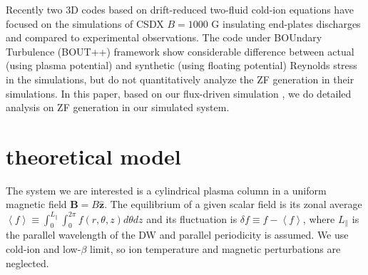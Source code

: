 \documentclass[aps,pre,twocolumn,superscriptaddress]{revtex4-2}
\begin{document}
Recently two 3D codes based on drift-reduced two-fluid cold-ion equations have focused on the simulations of CSDX $B=1000$ G insulating end-plates discharges \cite{Vaezi_2017V, Lang_2019} and compared to experimental observations. The code under BOUndary Turbulence (BOUT++) framework \cite{Vaezi_2017V} show considerable difference between actual (using plasma potential) and synthetic (using floating potential) Reynolds stress in the simulations, but do not quantitatively analyze the ZF generation in their simulations. In this paper, based on our flux-driven simulation \cite{Lang_2019}, we do detailed analysis on ZF generation in our simulated system.  

\section{\label{sec:theoretical model}theoretical model}
The system we are interested is a cylindrical plasma column in a uniform magnetic field $\bm{B}=B\hat{\bm{z}}$. The equilibrium of a given scalar field is its zonal average $\left<f\right>\equiv\int_{0}^{L_{\parallel}}\int_{0}^{2\pi}f \left(r,\theta,z\right)d\theta dz$ and its fluctuation is $\delta f\equiv f-\left<f\right>$, where $L_{\parallel}$ is the parallel wavelength of the DW and parallel periodicity is assumed. We use cold-ion and low-$\beta$ limit, so ion temperature and magnetic perturbations are neglected.
\end{document}

